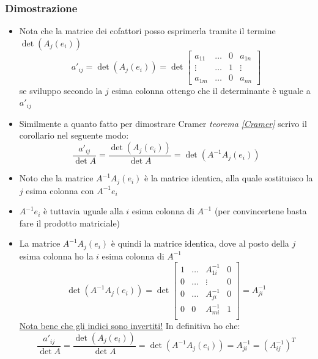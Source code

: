 \documentclass[12pt,a4paper,oneside]{article}
\begin{document}
\subsubsection*{Dimostrazione}
\begin{itemize}
	\item Nota che la matrice dei cofattori posso esprimerla tramite il termine $ \det \left( A_j \left( e_i \right)  \right)  $
	      \[
		      a'_{ij}= \det  \left( A_j \left( e_i \right)  \right) = \det
		      \begin{bmatrix}
			      a_{11}  & \ldots & 0 & a_{1n} \\
			      \vdots  & \ldots & 1 & \vdots \\
			      a_{1 m} & \ldots & 0 & a_{nn}
		      \end{bmatrix}
	      \]
	      se sviluppo secondo la $ j $ esima colonna ottengo che il determinante è uguale a $ a'_{ij} $
	\item Similmente a quanto fatto per dimostrare Cramer \textit{teorema  \ref{Cramer}} scrivo il corollario nel seguente modo:
	      \[
		      \frac{a'_{ij}}{\det A}=\frac{\det \left( A_j\left( e_i \right)  \right) }{\det A}=\det \left( A^{-1} A_j\left( e_i \right)  \right)
	      \]
	\item Noto che la matrice $ A^{-1}A_j\left( e_i \right)  $ è la matrice identica, alla quale sostituisco la $ j $ esima colonna con $ A^{-1}e_i $
	\item $ A^{-1}e_i $ è tuttavia uguale alla $ i $ esima colonna di $ A^{-1} $ (per convincertene basta fare il prodotto matriciale)
	\item La matrice $ A^{-1}A_j\left( e_i \right)  $ è quindi la matrice identica, dove al posto della $ j $ esima colonna ho la $ i $ esima colonna di $ A^{-1} $
	      \[
		      \det \left( A^{-1} A_j\left( e_i \right)  \right)= \det
		      \begin{bmatrix}
			      1 & \ldots & A^{-1}_{1i} & 0 \\
			      0 & \ldots & \vdots      & 0 \\
			      0 & \ldots & A^{-1}_{ji} & 0 \\
			      0 & 0      & A^{-1}_{mi} & 1 \\
		      \end{bmatrix}
		      = A^{-1}_{ji}
	      \]
	      \underline{Nota bene che gli indici sono invertiti!} In definitiva ho che:
	      \[
		      \frac{a'_{ij}}{\det A} = \frac{\det \left( A_j\left( e_i \right)  \right) }{\det A}=\det \left( A^{-1}A_j\left( e_i \right)  \right) = A^{-1}_{ji}=\left( A^{-1}_{ij} \right) ^{T}
	      \]
\end{itemize}
\end{document}
